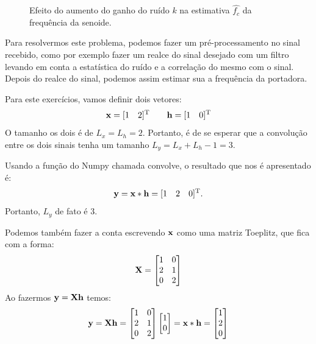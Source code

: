 \documentclass{homeworkclass}
\begin{document}
\begin{homeworkProblem}
\begin{figure}[!h]
		\caption{Efeito do aumento do ganho do ruído $k$ na estimativa $\hat{f_c}$ da frequência da senoide.}
		\label{fig:ruidera}
	\end{figure}

	Para resolvermos este problema, podemos fazer um pré-processamento no sinal recebido, como por exemplo fazer um realce do sinal desejado com um filtro levando em conta a estatística do ruído e a correlação do mesmo com o sinal. Depois do realce do sinal, podemos assim estimar sua a frequência da portadora.
	
\end{homeworkProblem}

\cleardoublepage
\begin{homeworkProblem}
	
	Para este exercícios, vamos definir dois vetores:
	\begin{equation*}
	\mathbf{x} = [1 \quad 2]^{\mathrm{T}} \qquad
	\mathbf{h} = [1 \quad 0]^{\mathrm{T}}
	\end{equation*}
	O tamanho os dois é de $L_{x} = L_{h} = 2$. Portanto, é de se esperar que a convolução entre os dois sinais tenha um tamanho $L_{y} = L_{x} + L_{h} - 1 = 3$.
	
	Usando a função do Numpy chamada convolve, o resultado que nos é apresentado é:
	\begin{equation*}
	\mathbf{y} = \mathbf{x} * \mathbf{h} = [1 \quad 2 \quad 0]^{\mathrm{T}}. 
	\end{equation*}
	Portanto, $L_{y}$ de fato é 3.
	
	Podemos também fazer a conta escrevendo $\mathbf{x}$ como uma matriz Toeplitz, que fica com a forma:
	\begin{equation*} \mathbf{X} = 
	\begin{bmatrix}
	1 & 0 \\ 
	2 & 1 \\ 
	0 & 2
	\end{bmatrix} 
	\end{equation*}
	Ao fazermos $\mathbf{y} = \mathbf{X}\mathbf{h}$ temos:
	\begin{equation*}
	\mathbf{y} = \mathbf{X}\mathbf{h} = 	\begin{bmatrix}
	1 & 0 \\ 
	2 & 1 \\ 
	0 & 2
	\end{bmatrix} 	\begin{bmatrix}
	1  \\ 
	0	\end{bmatrix} = \mathbf{x} * \mathbf{h} = \begin{bmatrix}
	1 \\ 
	2 \\ 
	0 
	\end{bmatrix} 
	\end{equation*}
	

\end{homeworkProblem}
\end{document}
